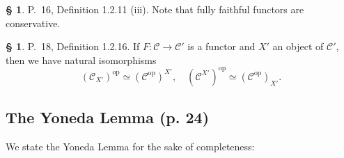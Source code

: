 \documentclass[12pt]{article}%
\theoremstyle{remark}
\theoremstyle{definition}
\newtheorem{s}[thm]{\S}%
\newcommand{\C}{\mathcal C}
\DeclareMathOperator{\op}{op}
\begin{document}
%

\begin{s}\label{ffc}
P.~16, Definition 1.2.11 (iii). Note that fully faithful functors are conservative. 
\end{s}

%

\begin{s}
P.~18, Definition 1.2.16. If $F:\C\to\C'$ is a functor and $X'$ an object of $\C'$, then we have natural isomorphisms 
\begin{equation}\label{opslice}
(\C_{X'})^{\op}\simeq(\C^{\op})^{X'},\quad(\C^{X'})^{\op}\simeq(\C^{\op})_{X'}.
\end{equation}
\end{s}


\subsection{The Yoneda Lemma (p. 24)}

We state the Yoneda Lemma for the sake of completeness:
\end{document}
